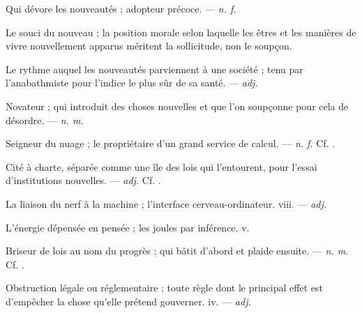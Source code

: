  Qui dévore les nouveautés ; adopteur précoce.   ---  \textit{n. f.}

 Le souci du nouveau ; la position morale selon laquelle les êtres et les manières de vivre nouvellement apparus méritent la sollicitude, non le soupçon.

 Le rythme auquel les nouveautés parviennent à une société ; tenu par l'anabathmiste pour l'indice le plus sûr de sa santé. ---  \textit{adj.}

 Novateur ; qui introduit des choses nouvelles et que l'on soupçonne pour cela de désordre. ---  \textit{n. m.}

 Seigneur du nuage ; le propriétaire d'un grand service de calcul. ---  \textit{n. f.} Cf. .

 Cité à charte, séparée comme une île des lois qui l'entourent, pour l'essai d'institutions nouvelles. ---  \textit{adj.} Cf. .

 La liaison du nerf à la machine ; l'interface cerveau-ordinateur.   viii. ---  \textit{adj.}

 L'énergie dépensée en pensée ; les joules par inférence.   v.

 Briseur de lois au nom du progrès ; qui bâtit d'abord et plaide ensuite. ---  \textit{n. m.} Cf. .

 Obstruction légale ou réglementaire ; toute règle dont le principal effet est d'empêcher la chose qu'elle prétend gouverner.   iv. ---  \textit{adj.}

